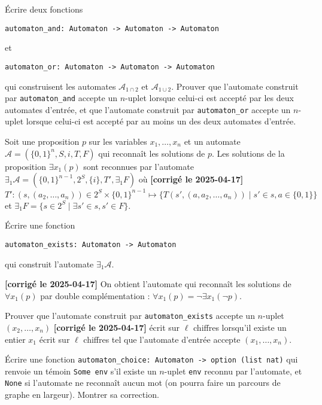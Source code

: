 \documentclass{article}
\begin{document}
Écrire deux fonctions
\begin{verbatim}
automaton_and: Automaton -> Automaton -> Automaton
\end{verbatim}
et
\begin{verbatim}
automaton_or: Automaton -> Automaton -> Automaton
\end{verbatim}
qui construisent les automates \(\mathcal A_{1 \cap 2}\) et \(\mathcal A_{1 \cup 2}\). Prouver que l'automate construit par \texttt{automaton_and} accepte un \(n\)-uplet lorsque celui-ci est accepté par les deux automates d'entrée, et que l'automate construit par \texttt{automaton_or}
accepte un \(n\)-uplet lorsque celui-ci est accepté par au moins un des deux automates d'entrée.

Soit une proposition \(p\) sur les variables \(x_1, \dots, x_n\) et un automate \(\mathcal A = (\{0,1\}^n, S, i, T, F)\) qui reconnaît les solutions de \(p\). Les solutions de la proposition \(\exists x_1 (p)\) sont reconnues par l'automate \(\exists_1 \mathcal A = (\{0,1\}^{n-1}, 2^S, \{i\}, T', \exists_1F)\) où \textbf{[corrigé le 2025-04-17]} \(T' : (s, (a_2, \dots, a_n)) \in 2^S \times \{0,1\}^{n-1} \mapsto \{T(s', (a, a_2, \dots, a_n)) \mid s' \in s, a \in \{0, 1\}\}\)
et \(\exists_1F = \{s \in 2^S \mid \exists s' \in s, s' \in F\}\).

Écrire une fonction
\begin{verbatim}
automaton_exists: Automaton -> Automaton
\end{verbatim}
qui construit l'automate \(\exists_1 \mathcal A\).

\textbf{[corrigé le 2025-04-17]} On obtient l'automate qui reconnaît les solutions de \(\forall x_1 (p)\) par double complémentation : \(\forall x_1 (p) = \neg \exists x_1(\neg p)\).

Prouver que l'automate construit par \texttt{automaton_exists} accepte un \(n\)-uplet \((x_2, \dots, x_n)\) \textbf{[corrigé le 2025-04-17]} écrit sur \(\ell\) chiffres
lorsqu'il existe un entier \(x_1\) écrit sur \(\ell\) chiffres tel que l'automate d'entrée accepte \((x_1, \dots, x_n)\).

Écrire une fonction \texttt{automaton_choice: Automaton -> option (list nat)} qui renvoie un témoin \texttt{Some env} s'il existe un \(n\)-uplet \texttt{env} reconnu par l'automate, et \texttt{None} si l'automate ne reconnaît aucun mot (on pourra faire un parcours de graphe en largeur). Montrer sa correction.
\end{document}
